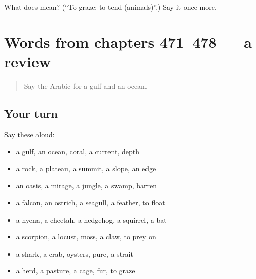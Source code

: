 \begin{tcolorbox}[breakable,colback=teal!4,colframe=teal!35!black,title={Before you move on}]
What does  mean? (\textquotedblleft{}To graze; to tend (animals)\textquotedblright{}.) Say it once more.
\end{tcolorbox}
\section[(dialogue)]{Words from chapters 471–478 — a review}

\label{lesson:AR-R478-review-471-478}



\begin{quote}
Say the Arabic for a gulf and an ocean.
\end{quote}

\subsection*{Your turn}
Say these aloud:

\begin{itemize}
\raggedright
  \item a gulf, an ocean, coral, a current, depth
  \item a rock, a plateau, a summit, a slope, an edge
  \item an oasis, a mirage, a jungle, a swamp, barren
  \item a falcon, an ostrich, a seagull, a feather, to float
  \item a hyena, a cheetah, a hedgehog, a squirrel, a bat
  \item a scorpion, a locust, moss, a claw, to prey on
  \item a shark, a crab, oysters, pure, a strait
  \item a herd, a pasture, a cage, fur, to graze
\end{itemize}

